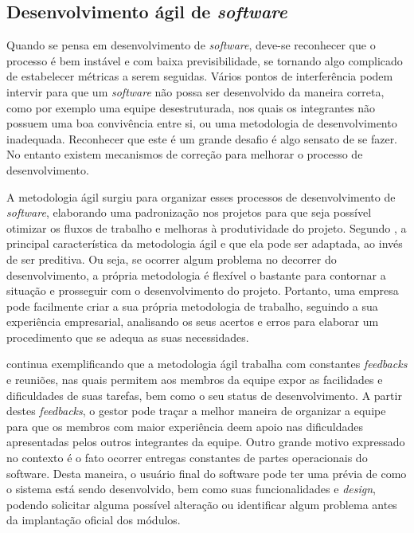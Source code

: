 \subsection{{Desenvolvimento ágil de \textit{software}}}

Quando se pensa em desenvolvimento de \textit{software}, deve-se reconhecer que o processo é bem instável e com baixa previsibilidade, se tornando algo complicado de estabelecer métricas a serem seguidas. Vários pontos de interferência podem intervir para que um \textit{software} não possa ser desenvolvido da maneira correta, como por exemplo uma equipe desestruturada, nos quais os integrantes não possuem uma boa convivência entre si, ou uma metodologia de desenvolvimento inadequada. Reconhecer que este é um grande desafio é algo sensato de se fazer. No entanto existem mecanismos de correção para melhorar o processo de desenvolvimento.

A metodologia ágil surgiu para organizar esses processos de desenvolvimento de \textit{software}, elaborando uma padronização nos projetos para que seja possível otimizar os fluxos de trabalho e melhoras à produtividade do projeto. Segundo , a principal característica da metodologia ágil e que ela pode ser adaptada, ao invés de ser preditiva. Ou seja, se ocorrer algum problema no decorrer do desenvolvimento, a própria metodologia é flexível o bastante para contornar a situação e prosseguir com o desenvolvimento do projeto. Portanto, uma empresa pode facilmente criar a sua própria metodologia de trabalho, seguindo a sua experiência empresarial, analisando os seus acertos e erros para elaborar um procedimento que se adequa as suas necessidades. 

 continua exemplificando que a metodologia ágil trabalha com constantes \textit{feedbacks} e reuniões, nas quais permitem aos membros da equipe expor as facilidades e dificuldades de suas tarefas, bem como o seu status de desenvolvimento. A partir destes \textit{feedbacks}, o gestor pode traçar a melhor maneira de organizar a equipe para que os membros com maior experiência deem apoio nas dificuldades apresentadas pelos outros integrantes da equipe. Outro grande motivo expressado no contexto é o fato ocorrer entregas constantes de partes operacionais do software. Desta maneira, o usuário final do software pode ter uma prévia de como o sistema está sendo desenvolvido, bem como suas funcionalidades e \textit{design}, podendo solicitar alguma possível alteração ou identificar algum problema antes da implantação oficial dos módulos.



